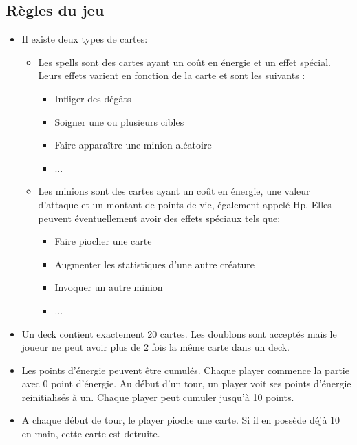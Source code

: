 \subsection{Règles du jeu}
\begin{itemize}[labelindent=16pt]
    \item Il existe deux types de cartes:
        \begin{itemize}[label=\textbullet]
            \item Les spells sont des cartes ayant un coût en énergie et un effet spécial. Leurs effets varient en fonction de la carte et sont les suivants :
            \begin{itemize}[label=\textasteriskcentered]
                \item Infliger des dégâts 
                \item Soigner une ou plusieurs cibles
                \item Faire apparaître une minion aléatoire
                \item ...
            \end{itemize}
            \item Les minions sont des cartes ayant un coût en énergie, une valeur d'attaque et un montant de points de vie, également appelé Hp. Elles peuvent éventuellement avoir des effets spéciaux tels que:
                \begin{itemize}[label=\textasteriskcentered]
                \item Faire piocher une carte
                \item Augmenter les statistiques d'une autre créature
                \item Invoquer un autre minion
                \item ...
                \end{itemize}
        \end{itemize}
    \item Un deck contient exactement 20 cartes. Les doublons sont acceptés mais le joueur ne peut avoir plus de 2 fois la même carte dans un deck.
    \item Les points d'énergie peuvent être cumulés. Chaque player commence la partie avec 0 point d'énergie. Au début d'un tour, un player voit ses points d'énergie reinitialisés à un. Chaque player peut cumuler jusqu'à 10 points.
    \item A chaque début de tour, le player pioche une carte. Si il en possède déjà 10 en main, cette carte est detruite.

\end{itemize}
